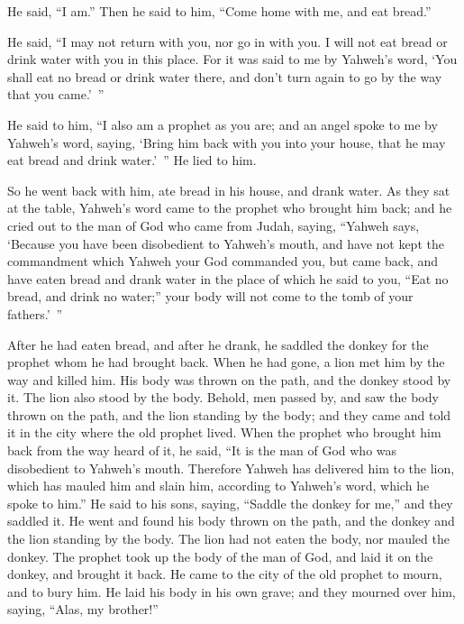 {\par }{\PP He said, “I am.”
Then he said to him, “Come home with me, and eat bread.”
\par }{\PP {}He said, “I may not return with you, nor go in with you. I will not eat bread or drink water with you in this place.
For it was said to me by Yahweh’s word, ‘You shall eat no bread or drink water there, and don’t turn again to go by the way that you came.’ ”
\par }{\PP {}He said to him, “I also am a prophet as you are; and an angel spoke to me by Yahweh’s word, saying, ‘Bring him back with you into your house, that he may eat bread and drink water.’ ” He lied to him.
\par }{\PP {}So he went back with him, ate bread in his house, and drank water.
As they sat at the table, Yahweh’s word came to the prophet who brought him back;
and he cried out to the man of God who came from Judah, saying, “Yahweh says, ‘Because you have been disobedient to Yahweh’s mouth, and have not kept the commandment which Yahweh your God commanded you,
but came back, and have eaten bread and drank water in the place of which he said to you, “Eat no bread, and drink no water;” your body will not come to the tomb of your fathers.’ ”
\par }{\PP {}After he had eaten bread, and after he drank, he saddled the donkey for the prophet whom he had brought back.
When he had gone, a lion met him by the way and killed him. His body was thrown on the path, and the donkey stood by it. The lion also stood by the body.
Behold, men passed by, and saw the body thrown on the path, and the lion standing by the body; and they came and told it in the city where the old prophet lived.
When the prophet who brought him back from the way heard of it, he said, “It is the man of God who was disobedient to Yahweh’s mouth. Therefore Yahweh has delivered him to the lion, which has mauled him and slain him, according to Yahweh’s word, which he spoke to him.”
He said to his sons, saying, “Saddle the donkey for me,” and they saddled it.
He went and found his body thrown on the path, and the donkey and the lion standing by the body. The lion had not eaten the body, nor mauled the donkey.
The prophet took up the body of the man of God, and laid it on the donkey, and brought it back. He came to the city of the old prophet to mourn, and to bury him.
He laid his body in his own grave; and they mourned over him, saying, “Alas, my brother!”
}
